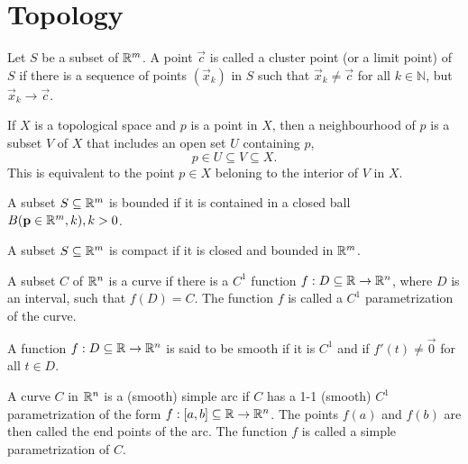 \documentclass{article}
\begin{document}
\section{Topology}
\begin{definition}
    Let $S$ be a subset of $\mathbb{R}^m$. A point $\vec{c}$ is
    called a cluster point (or a limit point) of $S$ if there is a
    sequence of points $(\vec{x}_k)$ in $S$ such that $\vec{x}_k \neq \vec{c}$ for
    all $k \in \mathbb{N}$, but $\vec{x}_k \rightarrow \vec{c}$.
\end{definition}

\begin{definition}
    If $X$ is a topological space and $p$ is a point in $X$,
    then a neighbourhood of $p$ is a subset $V$ of $X$ that
    includes an open set $U$ containing $p$,
    \begin{equation*}
        p \in U \subseteq V \subseteq X.
    \end{equation*}
    This is equivalent to the point $p \in X$ beloning to the
    interior of $V$ in $X$.
\end{definition}

\begin{definition}
    A subset $S \subseteq \mathbb{R}^m$ is bounded if it is contained in a closed
    ball $B(\mathbf{p} \in \mathbb{R}^m, k), k > 0$.
\end{definition}

\begin{definition}
    A subset $S \subseteq \mathbb{R}^m$ is compact if it is closed and bounded in $\mathbb{R}^m$.
\end{definition}

\begin{definition}[Curve]
    A subset $C$ of $\mathbb{R}^n$ is a curve if there is a $C^1$ function
    $f: D \subseteq \mathbb{R} \rightarrow \mathbb{R}^n$, where $D$ is an interval, such that
    $f(D) = C$. The function $f$ is called a $C^1$ parametrization of the curve.
\end{definition}

\begin{definition}
    A function $f: D \subseteq \mathbb{R} \rightarrow \mathbb{R}^n$ is said to be smooth if it is
    $C^1$ and if $f'(t) \neq \vec{0}$ for all $t \in D$.
\end{definition}

\begin{definition}
    A curve $C$ in $\mathbb{R}^n$ is a (smooth) simple arc if $C$ has a 1-1
    (smooth) $C^1$ parametrization of the form $f: [a, b] \subseteq \mathbb{R} \rightarrow \mathbb{R}^n$.
    The points $f(a)$ and $f(b)$ are then called the end points of the arc.
    The function $f$ is called a simple parametrization of $C$.
\end{definition}
\end{document}
